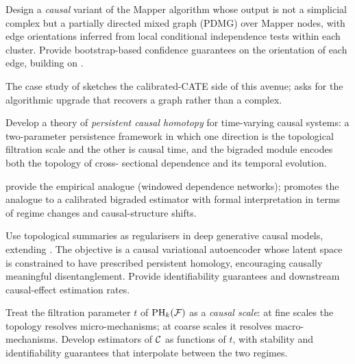 \begin{research}\label{r:causal-mapper}
Design a \emph{causal} variant of the Mapper algorithm
\citep{singh2007mapper,carriere2018statistical} whose output is not a
simplicial complex but a partially directed mixed graph (PDMG) over
Mapper nodes, with edge orientations inferred from local conditional
independence tests within each cluster. Provide bootstrap-based
confidence guarantees on the orientation of each edge, building on
\citet{lecci2014statistical}.
\end{research}

The case study of  sketches the calibrated-CATE
side of this avenue;  asks for the algorithmic
upgrade that recovers a graph rather than a complex.

\begin{research}\label{r:causal-homotopy}
Develop a theory of \emph{persistent causal homotopy} for time-varying
causal systems: a two-parameter persistence framework
\citep{carlsson2009theory,lesnick2015interactive} in which one
direction is the topological filtration scale and the other is causal
time, and the bigraded module encodes both the topology of cross-
sectional dependence and its temporal evolution.
\end{research}

\citet{elyaagoubi2023statistical} provide the empirical analogue
(windowed dependence networks);  promotes the
analogue to a calibrated bigraded estimator with formal interpretation
in terms of regime changes and causal-structure shifts.

\begin{research}
\label{r:topo-regularisation}
Use topological summaries as regularisers in deep generative causal
models, extending \citet{xu2021topological,farzam2025topology,
guan2025causal,ma2025causal}. The objective is a causal variational
autoencoder whose latent space is constrained to have prescribed
persistent homology, encouraging causally meaningful disentanglement.
Provide identifiability guarantees and downstream causal-effect
estimation rates.
\end{research}

\begin{research}\label{r:multiscale}
Treat the filtration parameter $t$ of $\mathrm{PH}_{k}(\mathcal{F})$ as a
\emph{causal scale}: at fine scales the topology resolves
micro-mechanisms; at coarse scales it resolves macro-mechanisms.
Develop estimators of $\mathcal{C}$ as functions of $t$, with stability and
identifiability guarantees that interpolate between the two regimes.
\end{research}

